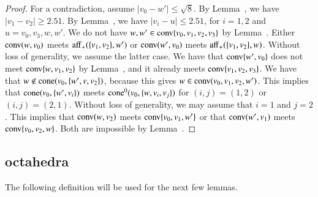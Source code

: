 \begin{tarskidata}
\begin{tarski}
\begin{proof}
For a contradiction, assume $|v_0-w'|\le\sqrt8$.  By
Lemma~, we have $|v_1-v_2|\ge 2.51$.
By Lemma~,\FIXX{$\CalE$}
we have $|v_i-u|\le 2.51$, for
$i=1,2$ and $u=v_0,v_3,w,w'$.  
We do not have $w,w'\in{\operatorname{conv}}\{v_0,v_1,v_2,v_3\}$ by Lemma~.  Either 
${\operatorname{conv}}(w,v_0)$ meets ${\operatorname{aff}}_+(\{v_1,v_2\},w')$ or
${\operatorname{conv}}(w',v_0)$ meets ${\operatorname{aff}}_+(\{v_1,v_2\},w)$.
Without loss of generality, we assume the latter case.
We have that ${\operatorname{conv}}\{w',v_0\}$ does not meet ${\operatorname{conv}}\{w,v_1,v_2\}$
by Lemma~,%
and it already meets ${\operatorname{conv}}\{v_1,v_2,v_3\}$.
We have that $w\not\in{\operatorname{cone}}(v_0,\{w',v,v_2\})$, because this
gives $w\in {\operatorname{conv}}(v_0,v_1,v_2,w')$.  This implies that
${\operatorname{cone}}(v_0,\{w',v_i\})$ meets ${\operatorname{cone}}^0(v_0,\{w,v_i,v_j\})$
for $(i,j)=(1,2)$ or $(i,j)=(2,1)$.  Without loss of generality,
we may assume that $i=1$ and $j=2$.   This implies that
${\operatorname{conv}}(w,v_2)$ meets ${\operatorname{conv}}\{v_0,v_1,w'\}$ or that
${\operatorname{conv}}(w',v_1)$ meets ${\operatorname{conv}}\{v_0,v_2,w\}$.  Both
are impossible by Lemma~.\FIXX{$\CalE$}
%
\end{proof}
\end{tarski}















\begin{tarski}
\subsection{octahedra}
The following definition will be used for the next few lemmas.


\end{tarski}
\end{tarskidata}
